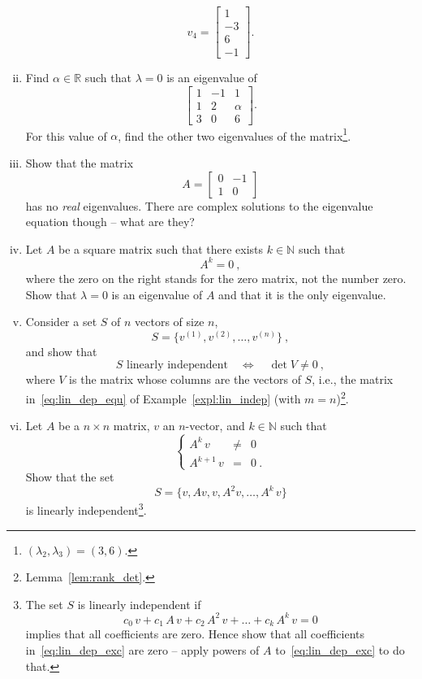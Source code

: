 \begin{exercise}
\begin{enumerate}[(i)]
\[	v_4 = \begin{bmatrix} 1 \\ -3 \\ 6 \\ -1 \end{bmatrix}. \]
	\item Find $\alpha \in \mathbb{R}$ such that $\lambda=0$ is an eigenvalue of
	\[ \begin{bmatrix} 1 & -1 & 1 \\ 1 & 2 & \alpha \\ 3 & 0 & 6 \end{bmatrix}. \]
	For this value of $\alpha$, find the other two eigenvalues of the matrix\footnote{$(\lambda_2,\lambda_3)=(3,6)$.}.
	\item Show that the matrix
		\[ A = \begin{bmatrix}
		0 & -1 \\ 1 & 0
		\end{bmatrix} \]
	has no \emph{real} eigenvalues. There are complex solutions to the eigenvalue equation though -- what are they?
 	\item Let $A$ be a square matrix such that there exists $k\in\mathbb{N}$ such that
 	\[ A^k = 0 \:, \]
 	where the zero on the right stands for the zero matrix, not the number zero. Show that $\lambda=0$ is an eigenvalue of $A$ and that it is the only eigenvalue.
 	\item Consider a set $S$ of $n$ vectors of size $n$,
 		\[ S = \{ v^{(1)},v^{(2)}, \dots , v^{(n)} \} \:, \]
 		and show that
 		\[ S \text{~linearly independent} \quad \Longleftrightarrow \quad \det V \not= 0 \:, \]
 		where $V$ is the matrix whose columns are the vectors of $S$, i.e., the matrix in~\eqref{eq:lin_dep_equ} of Example~\ref{expl:lin_indep} (with $m=n$)\footnote{Lemma~\ref{lem:rank_det}.}.
 	\item Let $A$ be a $n \times n$ matrix, $v$ an $n$-vector, and $k\in\mathbb{N}$ such that
 	\[ \left\{\begin{array}{rcl} A^k\,v & \not= & 0 \\
 	 A^{k+1}\,v & = & 0 \:. \end{array} \right. \]
 	Show that the set 
 	\[ S = \{ v,Av,v,A^2v,\ldots,A^k\,v\} \]
 	is linearly independent\footnote{The set $S$ is linearly independent if
 	\begin{equation}
 	\label{eq:lin_dep_exc}
 	c_0 \, v + c_1 \, A \, v + c_2 \, A^2 \, v + \ldots + c_k \, A^k \, v = 0
 	\tag{$\star$}
 	\end{equation}
 	implies that all coefficients are zero. Hence show that all coefficients in~\eqref{eq:lin_dep_exc} are zero -- apply powers of $A$ to~\eqref{eq:lin_dep_exc} to do that.}.

\end{enumerate}
\end{exercise}
